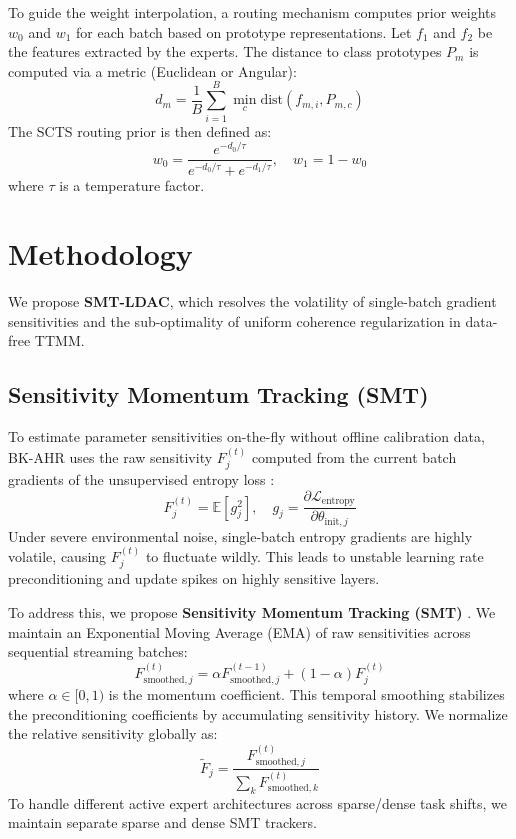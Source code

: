 \documentclass{article}
\theoremstyle{plain}
\theoremstyle{definition}
\theoremstyle{remark}
\begin{document}
To guide the weight interpolation, a routing mechanism computes prior weights $w_0$ and $w_1$ for each batch based on prototype representations. Let $f_1$ and $f_2$ be the features extracted by the experts. The distance to class prototypes $P_m$ is computed via a metric (Euclidean or Angular):
\begin{equation}
    d_m = \frac{1}{B} \sum_{i=1}^B \min_{c} \text{dist}(f_{m, i}, P_{m, c})
\end{equation}
The SCTS routing prior is then defined as:
\begin{equation}
    w_0 = \frac{e^{-d_0 / \tau}}{e^{-d_0 / \tau} + e^{-d_1 / \tau}}, \quad w_1 = 1 - w_0
\end{equation}
where $\tau$ is a temperature factor.

\section{Methodology}
\label{sec:method}
We propose \textbf{SMT-LDAC}, which resolves the volatility of single-batch gradient sensitivities and the sub-optimality of uniform coherence regularization in data-free TTMM.

\subsection{Sensitivity Momentum Tracking (SMT)}
To estimate parameter sensitivities on-the-fly without offline calibration data, BK-AHR uses the raw sensitivity $F_j^{(t)}$ computed from the current batch gradients of the unsupervised entropy loss \cite{Foret2020SharpnessAwareMF}:
\begin{equation}
    F_j^{(t)} = \mathbb{E}\left[ g_j^2 \right], \quad g_j = \frac{\partial \mathcal{L}_{\text{entropy}}}{\partial \theta_{\text{init}, j}}
\end{equation}
Under severe environmental noise, single-batch entropy gradients are highly volatile, causing $F_j^{(t)}$ to fluctuate wildly. This leads to unstable learning rate preconditioning and update spikes on highly sensitive layers.

To address this, we propose \textbf{Sensitivity Momentum Tracking (SMT)} \cite{Kwon2021ASAMAS}. We maintain an Exponential Moving Average (EMA) of raw sensitivities across sequential streaming batches:
\begin{equation}
    F_{\text{smoothed}, j}^{(t)} = \alpha F_{\text{smoothed}, j}^{(t-1)} + (1 - \alpha) F_j^{(t)}
\end{equation}
where $\alpha \in [0, 1)$ is the momentum coefficient. This temporal smoothing stabilizes the preconditioning coefficients by accumulating sensitivity history. We normalize the relative sensitivity globally as:
\begin{equation}
    \tilde{F}_j = \frac{F_{\text{smoothed}, j}^{(t)}}{\sum_k F_{\text{smoothed}, k}^{(t)}}
\end{equation}
To handle different active expert architectures across sparse/dense task shifts, we maintain separate sparse and dense SMT trackers.
\end{document}

